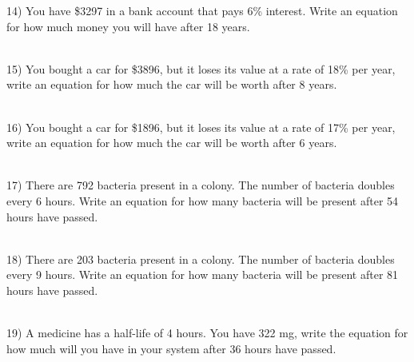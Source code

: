 \documentclass[12pt]{article}
\begin{document}
\hrulefill





14) You have \$3297 in a bank account that pays 6\% interest. Write an equation for how much money you will have after 18 years. \\ \\
 

\hrulefill







15) You bought a car for \$3896, but it loses its value at a rate of 18\% per year, write an equation for how much the car will be worth after 8 years. \\ \\
 

\hrulefill




16) You bought a car for \$1896, but it loses its value at a rate of 17\% per year, write an equation for how much the car will be worth after 6 years. \\ \\
 

\hrulefill







17) There are 792 bacteria present in a colony. The number of bacteria doubles every 6 hours. Write an equation for how many bacteria will be present after 54 hours have passed. \\ \\
 

\hrulefill





18) There are 203 bacteria present in a colony. The number of bacteria doubles every 9 hours. Write an equation for how many bacteria will be present after 81 hours have passed. \\ \\
 

\hrulefill






19) A medicine has a half-life of 4 hours. You have 322 mg, write the equation for how much will you have in your system after 36 hours have passed. \\ \\
 

\hrulefill
\end{document}
